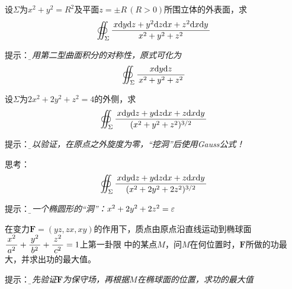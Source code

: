 \begin{frame}
	\linespread{1.2}
	设$\Sigma$为$x^2+y^2=R^2$及平面$z=\pm R\,(R>0)$所围立体的外表面，求
	$$\oiint_{\Sigma}\displaystyle\frac{\,{x\mathrm{d} y\mathrm{d} z+y^2\mathrm{d} z\mathrm{d} x+z^2\mathrm{d} x\mathrm{d} y}\,}{\,{x^2+y^2+z^2}\,}$$
		
	\bigskip\pause
	\alert{提示：}{\it\b
	利用第二型曲面积分的对称性，原式可化为
	$$\oiint_{\Sigma}\displaystyle\frac{\,{x\mathrm{d} y\mathrm{d} z}\,}{\,{x^2+y^2+z^2}\,}$$
	}
\end{frame}

\begin{frame}
	\linespread{1.2}
	设$\Sigma$为$2x^2+2y^2+z^2=4$的外侧，求
	$$\oiint_{\Sigma}\displaystyle\frac{\,{x\mathrm{d} y\mathrm{d} z+y\mathrm{d} z\mathrm{d} x+z\mathrm{d} x\mathrm{d} y}\,}{\,{(x^2+y^2+z^2)^{3/2}}\,}$$
		
	\bigskip\pause
	\alert{提示：}{\it\b
	可以验证，在原点之外旋度为零，“挖洞”后使用Gauss公式！\pause
	}
	
	\alert{思考：}{\it{}
	$$\oiint_{\Sigma}\displaystyle\frac{\,{x\mathrm{d} y\mathrm{d} z+y\mathrm{d} z\mathrm{d} x+z\mathrm{d} x\mathrm{d} y}\,}{\,{(x^2+2y^2+2z^2)^{3/2}}\,}$$
	}
	
	\pause\alert{提示：}{\it\b
	挖一个椭圆形的“洞”：$x^2+2y^2+2z^2=\varepsilon$
	}
\end{frame}

\begin{frame}
	\linespread{1.2}
	在变力$\bm{F}=(yz,zx,xy)$的作用下，质点由原点沿直线运动到椭球面
	$\displaystyle\frac{\,{x^2}\,}{\,{a^2}\,}+\displaystyle\frac{\,{y^2}\,}{\,{b^2}\,}+\displaystyle\frac{\,{z^2}\,}{\,{c^2}\,}=1$上第一卦限
	中的某点$M$，问$M$在何位置时，$\bm{F}$所做的功最大，并求出功的最大值。
		
	\bigskip\pause
	\alert{提示：}{\it\b
	首先验证$\bm{F}$为保守场，再根据$M$在椭球面的位置，求功的最大值
	}
\end{frame}